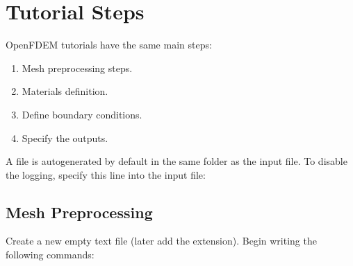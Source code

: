 \documentclass[letterpaper,10pt,english]{sphinxmanual}
\begin{document}
\section{Tutorial Steps}
\label{\detokenize{rst_tutorials/tutorial1_ucs:tutorial-steps}}
OpenFDEM tutorials have the same main steps:
\begin{enumerate}
%
\item {} 
Mesh pre\sphinxhyphen{}processing steps.

\item {} 
Materials definition.

\item {} 
Define boundary conditions.

\item {} 
Specify the outputs.

\end{enumerate}

A  file is auto\sphinxhyphen{}generated by default in the same folder as the input file. To disable the logging, specify this
line into the input file:

\begin{sphinxVerbatim}[commandchars=\\\{\}]
 
\end{sphinxVerbatim}


\subsection{Mesh Pre\sphinxhyphen{}processing}
\label{\detokenize{rst_tutorials/tutorial1_ucs:mesh-pre-processing}}
Create a new empty text file (later add the  extension). Begin writing the following commands:

\begin{sphinxVerbatim}[commandchars=\\\{\}]
\end{sphinxVerbatim}

\begin{sphinxVerbatim}[commandchars=\\\{\}]
       
\end{sphinxVerbatim}
\end{document}
